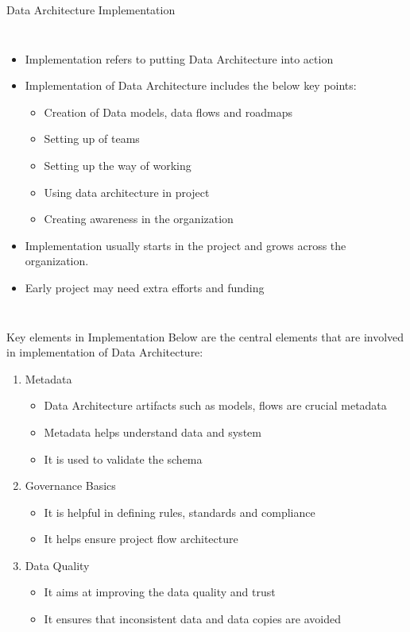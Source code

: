 \documentclass[aspectratio=169,professionalfonts]{beamer}
\newcommand{\sourcefooter}{\vspace{0.4em}{\tiny Source: DAMA-DMBOK2, Chapter 4 (Data Architecture).}}
\begin{document}
\begin{frame}{Data Architecture Implementation}
\begin{columns}[T,totalwidth=\textwidth]
\begin{itemize}
    \item Implementation refers to putting Data Architecture into action
    \item Implementation of Data Architecture includes the below key points: 
    \begin{itemize}
    	\item Creation of Data models, data flows and roadmaps
    	\item Setting up of teams
    	\item Setting up the way of working
    	\item Using data architecture in project
    	\item Creating awareness in the organization
    \end{itemize}
    \item Implementation usually starts in the project and grows across the organization.
    \item Early project may need extra efforts and funding
\end{itemize}
\end{columns}
\sourcefooter
\end{frame}

\begin{frame}{Key elements in Implementation}
	Below are the central elements that are involved in implementation of Data Architecture:
\begin{enumerate}
	\item Metadata
	\begin{itemize}
		\item Data Architecture artifacts such as models, flows are crucial metadata
		\item Metadata helps understand data and system
		\item It is used to validate the schema
	\end{itemize}
	\item Governance Basics
	\begin{itemize}
		\item It is helpful in defining rules, standards and compliance
		\item It helps ensure project flow architecture
	\end{itemize}
	\item Data Quality
	\begin{itemize}
		\item It aims at improving the data quality and trust
		\item It ensures that inconsistent data and data copies are avoided
	\end{itemize}
\end{enumerate}
\end{frame}
\end{document}
